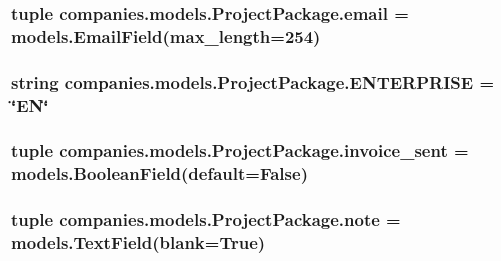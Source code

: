 \hypertarget{classcompanies_1_1models_1_1_project_package_a01c9036f837e5c6e355b70ca19687a7c}{
\subsubsection[{email}]{\setlength{\rightskip}{0pt plus 5cm}tuple companies.\-models.\-Project\-Package.\-email = models.\-Email\-Field(max\-\_\-length=254)\hspace{0.3cm}{\ttfamily [static]}}}\label{classcompanies_1_1models_1_1_project_package_a01c9036f837e5c6e355b70ca19687a7c}
\hypertarget{classcompanies_1_1models_1_1_project_package_a1925fa8a74daaa3e56b1a3812db55944}{
\subsubsection[{E\-N\-T\-E\-R\-P\-R\-I\-S\-E}]{\setlength{\rightskip}{0pt plus 5cm}string companies.\-models.\-Project\-Package.\-E\-N\-T\-E\-R\-P\-R\-I\-S\-E = \char`\"{}E\-N\char`\"{}\hspace{0.3cm}{\ttfamily [static]}}}\label{classcompanies_1_1models_1_1_project_package_a1925fa8a74daaa3e56b1a3812db55944}
\hypertarget{classcompanies_1_1models_1_1_project_package_a599168024fc8205661a532b00cbe98e6}{
\subsubsection[{invoice\-\_\-sent}]{\setlength{\rightskip}{0pt plus 5cm}tuple companies.\-models.\-Project\-Package.\-invoice\-\_\-sent = models.\-Boolean\-Field(default=False)\hspace{0.3cm}{\ttfamily [static]}}}\label{classcompanies_1_1models_1_1_project_package_a599168024fc8205661a532b00cbe98e6}
\hypertarget{classcompanies_1_1models_1_1_project_package_ae51d4824b5222f8bec6e3d5169c827c1}{
\subsubsection[{note}]{\setlength{\rightskip}{0pt plus 5cm}tuple companies.\-models.\-Project\-Package.\-note = models.\-Text\-Field(blank=True)\hspace{0.3cm}{\ttfamily [static]}}}\label{classcompanies_1_1models_1_1_project_package_ae51d4824b5222f8bec6e3d5169c827c1}
